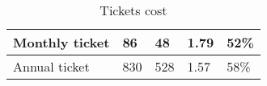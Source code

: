 \begin{table}[h]
\begin{tabular}{|l|l|l|l|l|}
Monthly ticket                                                                                        & 86                                 & 48                                                                                             & 1.79                                                                                              & 52\%                                                                                     \\ \hline
Annual ticket                                                                                         & 830                                & 528                                                                                            & 1.57                                                                                              & 58\%                                                                                     \\ \hline
\end{tabular}
\caption{Tickets cost}
\label{tab:ticket}
\end{table}